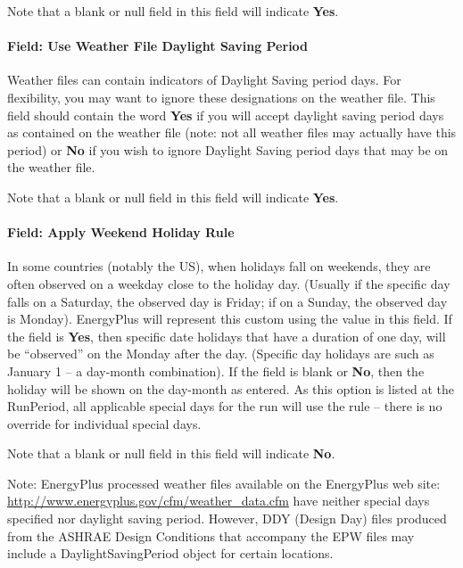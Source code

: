 Note that a blank or null field in this field will indicate \textbf{Yes}.

\paragraph{Field: Use Weather File Daylight Saving Period}\label{field-use-weather-file-daylight-saving-period-2}

Weather files can contain indicators of Daylight Saving period days. For flexibility, you may want to ignore these designations on the weather file. This field should contain the word \textbf{Yes} if you will accept daylight saving period days as contained on the weather file (note: not all weather files may actually have this period) or \textbf{No} if you wish to ignore Daylight Saving period days that may be on the weather file.

Note that a blank or null field in this field will indicate \textbf{Yes}.

\paragraph{Field: Apply Weekend Holiday Rule}\label{field-apply-weekend-holiday-rule}

In some countries (notably the US), when holidays fall on weekends, they are often observed on a weekday close to the holiday day. (Usually if the specific day falls on a Saturday, the observed day is Friday; if on a Sunday, the observed day is Monday). EnergyPlus will represent this custom using the value in this field. If the field is \textbf{Yes}, then specific date holidays that have a duration of one day, will be ``observed'' on the Monday after the day. (Specific day holidays are such as January 1 -- a day-month combination). If the field is blank or \textbf{No}, then the holiday will be shown on the day-month as entered. As this option is listed at the RunPeriod, all applicable special days for the run will use the rule -- there is no override for individual special days.

Note that a blank or null field in this field will indicate \textbf{No}.

\begin{callout}
Note: EnergyPlus processed weather files available on the EnergyPlus web site: \url{http://www.energyplus.gov/cfm/weather\_data.cfm} have neither special days specified nor daylight saving period. However, DDY (Design Day) files produced from the ASHRAE Design Conditions that accompany the EPW files may include a DaylightSavingPeriod object for certain locations.
\end{callout}


